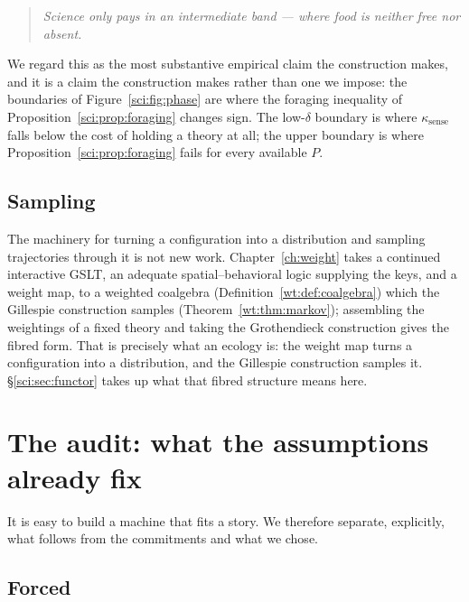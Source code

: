 \begin{quote}
\itshape Science only pays in an intermediate band --- where food is neither free nor absent.
\end{quote}

We regard this as the most substantive empirical claim the construction makes, and it is a claim the
construction makes rather than one we impose: the boundaries of Figure~\ref{sci:fig:phase} are where the
foraging inequality of Proposition~\ref{sci:prop:foraging} changes sign. The low-$\delta$ boundary is
where $\kappa_{\mathrm{sense}}$ falls below the cost of holding a theory at all; the upper boundary is
where Proposition~\ref{sci:prop:foraging} fails for every available $P$.

\subsection{Sampling}\label{sci:S13.3}

The machinery for turning a configuration into a distribution and sampling trajectories through it is
not new work. Chapter~\ref{ch:weight} takes a continued interactive GSLT, an adequate
spatial--behavioral logic supplying the keys, and a weight map, to a weighted coalgebra
(Definition~\ref{wt:def:coalgebra}) which the Gillespie construction samples
(Theorem~\ref{wt:thm:markov}); assembling the weightings of a fixed theory and taking
the Grothendieck construction gives the fibred form. That is
precisely what an ecology is: the weight map turns a configuration into a distribution, and the
Gillespie construction samples it. \S\ref{sci:sec:functor} takes up what that fibred structure means here.

\section{The audit: what the assumptions already fix}\label{sci:S14}
\label{sci:sec:audit}

It is easy to build a machine that fits a story. We therefore separate, explicitly, what follows from
the commitments and what we chose.

\subsection{Forced}\label{sci:S14.1}

